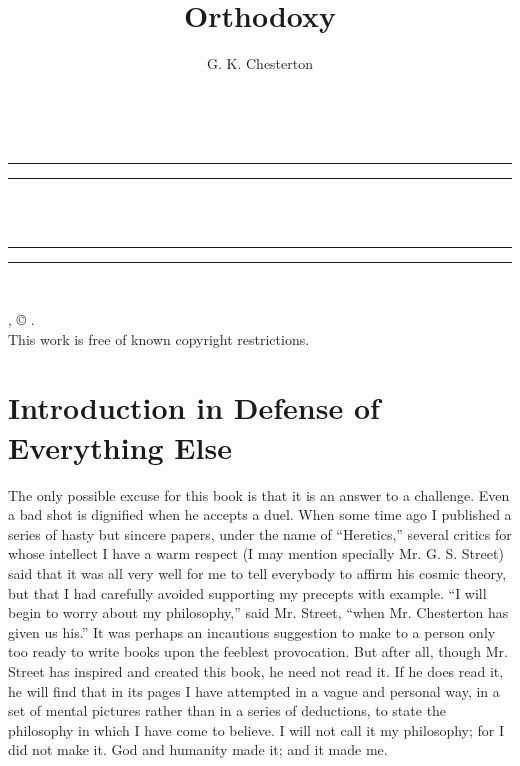\documentclass{book}
\date{}
\title{Orthodoxy}
\author{G. K. Chesterton}
\makeatletter
\renewcommand{\maketitle}{
  \thispagestyle{empty}
  \vspace*{\stretch{1}}
  
  \begin{center}
    {\Huge \@title   \\[5mm]}
  \end{center}
  \vspace*{\stretch{2}}
  
  \newpage
  \thispagestyle{empty}
  \cleardoublepage

  \begin{center}  
    \thispagestyle{empty}
    \vspace*{\baselineskip}
    \rule{\textwidth}{1.6pt}\vspace*{-\baselineskip}\vspace*{2pt}
    \rule{\textwidth}{0.4pt}\\[\baselineskip]
    
    {\Huge\scshape \@title   \\[5mm]}
    {\Large }
    
    \rule{\textwidth}{0.4pt}\vspace*{-\baselineskip}\vspace{3.2pt}
    \rule{\textwidth}{1.6pt}\\[\baselineskip]

    \vspace*{4\baselineskip}

    {\Large \@author}
    \vfill
    
  \end{center}
  
  \pagebreak
  \newpage
  \thispagestyle{empty}
  \null\vfill
  \noindent
  \begin{center}
    {\emph{\@title}, © \@author.\\[5mm]}
    {This work is free of known copyright restrictions.\\[5mm]}
  \end{center}
  \pagebreak
  \newpage
}
\makeatother
\begin{document}



\maketitle

\setcounter{tocdepth}{0}
\setcounter{secnumdepth}{0}
\tableofcontents
\chapter{Introduction in Defense of Everything Else}
\label{chapter-0}
The only possible excuse for this book is that it is an answer to a challenge. Even a bad shot is dignified when he accepts a duel. When some time ago I published a series of hasty but sincere papers, under the name of “Heretics,” several critics for whose intellect I have a warm respect (I may mention specially Mr. G. S. Street) said that it was all very well for me to tell everybody to affirm his cosmic theory, but that I had carefully avoided supporting my precepts with example. “I will begin to worry about my philosophy,” said Mr. Street, “when Mr. Chesterton has given us his.” It was perhaps an incautious suggestion to make to a person only too ready to write books upon the feeblest provocation. But after all, though Mr. Street has inspired and created this book, he need not read it. If he does read it, he will find that in its pages I have attempted in a vague and personal way, in a set of mental pictures rather than in a series of deductions, to state the philosophy in which I have come to believe. I will not call it my philosophy; for I did not make it. God and humanity made it; and it made me.
\end{document}
